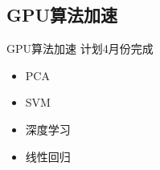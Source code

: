 \documentclass{beamer}
\begin{document}
\subsection{GPU算法加速}
\begin{frame}{GPU算法加速}
计划4月份完成
\begin{itemize}
\item PCA
\item SVM
\item 深度学习
\item 线性回归
\end{itemize}
\end{frame} %
\end{document}
